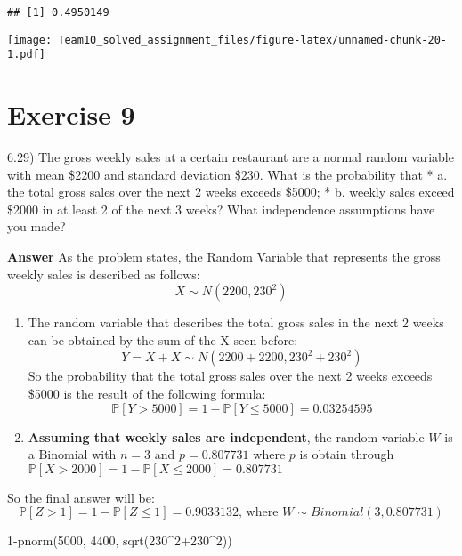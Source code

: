 \documentclass[
]{article}
\newenvironment{Shaded}{\begin{snugshade}}{\end{snugshade}}
\newcommand{\DecValTok}[1]{\textcolor[rgb]{0.00,0.00,0.81}{#1}}
\newcommand{\FunctionTok}[1]{\textcolor[rgb]{0.00,0.00,0.00}{#1}}
\newcommand{\NormalTok}[1]{#1}
\newcommand{\SpecialCharTok}[1]{\textcolor[rgb]{0.00,0.00,0.00}{#1}}
\begin{document}
\begin{verbatim}
## [1] 0.4950149
\end{verbatim}

\texttt{[image: Team10\_solved\_assignment\_files/figure-latex/unnamed-chunk-20-1.pdf]}

\hypertarget{exercise-9}{%
\section{Exercise 9}\label{exercise-9}}

6.29) The gross weekly sales at a certain restaurant are a normal random
variable with mean \$2200 and standard deviation \$230. What is the
probability that * a. the total gross sales over the next 2 weeks
exceeds \$5000; * b. weekly sales exceed \$2000 in at least 2 of the
next 3 weeks? What independence assumptions have you made?

\textbf{Answer} As the problem states, the Random Variable that
represents the gross weekly sales is described as follows:
\[X\sim N(2200, 230^2)\]

\begin{enumerate}
\def\labelenumi{\alph{enumi})}
\item
  The random variable that describes the total gross sales in the next 2
  weeks can be obtained by the sum of the X seen before:
  \[Y = X+X\sim N(2200+2200, 230^2+230^2)\] So the probability that the
  total gross sales over the next 2 weeks exceeds \$5000 is the result
  of the following formula:
  \[\mathbb P[Y>5000] = 1-\mathbb P[Y\leq 5000]=0.03254595\]
\item
  \textbf{Assuming that weekly sales are independent}, the random
  variable \(W\) is a Binomial with \(n=3\) and \(p=0.807731\) where
  \(p\) is obtain through
  \(\mathbb P[X>2000]=1-\mathbb P[X\leq 2000]=0.807731\)
\end{enumerate}

So the final answer will be:
\[\mathbb P[Z>1]=1-\mathbb P[Z\leq 1]=0.9033132\text{, where }W\sim Binomial(3, 0.807731)\]

\begin{Shaded}
\begin{Highlighting}[]
\DecValTok{1}\SpecialCharTok{{-}}\FunctionTok{pnorm}\NormalTok{(}\DecValTok{5000}\NormalTok{, }\DecValTok{4400}\NormalTok{, }\FunctionTok{sqrt}\NormalTok{(}\DecValTok{230}\SpecialCharTok{\^{}}\DecValTok{2}\SpecialCharTok{+}\DecValTok{230}\SpecialCharTok{\^{}}\DecValTok{2}\NormalTok{))}
\end{Highlighting}
\end{Shaded}
\end{document}

